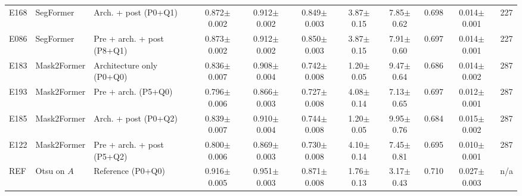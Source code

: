 \begin{table}[t]
\begin{tabularx}{\textwidth}{L{0.7cm} L{1.6cm} Y c c c c c c c c}
E168 & SegFormer & Arch. + post (P0+Q1) & 0.872{\scriptsize$\pm$0.002} & 0.912{\scriptsize$\pm$0.002} & 0.849{\scriptsize$\pm$0.003} & 3.87{\scriptsize$\pm$0.15} & 7.85{\scriptsize$\pm$0.62} & 0.698 & 0.014{\scriptsize$\pm$0.001} & 227 \\
E086 & SegFormer & Pre + arch. + post (P8+Q1) & 0.873{\scriptsize$\pm$0.002} & 0.912{\scriptsize$\pm$0.002} & 0.850{\scriptsize$\pm$0.003} & 3.87{\scriptsize$\pm$0.15} & 7.91{\scriptsize$\pm$0.60} & 0.697 & 0.014{\scriptsize$\pm$0.001} & 227 \\
\addlinespace
E183 & Mask2Former & Architecture only (P0+Q0) & 0.836{\scriptsize$\pm$0.007} & 0.908{\scriptsize$\pm$0.004} & 0.742{\scriptsize$\pm$0.008} & 1.20{\scriptsize$\pm$0.05} & 9.47{\scriptsize$\pm$0.64} & 0.686 & 0.014{\scriptsize$\pm$0.002} & 287 \\
E193 & Mask2Former & Pre + arch. (P5+Q0) & 0.796{\scriptsize$\pm$0.006} & 0.866{\scriptsize$\pm$0.003} & 0.727{\scriptsize$\pm$0.008} & 4.08{\scriptsize$\pm$0.14} & 7.13{\scriptsize$\pm$0.65} & 0.697 & 0.012{\scriptsize$\pm$0.001} & 287 \\
E185 & Mask2Former & Arch. + post (P0+Q2) & 0.839{\scriptsize$\pm$0.007} & 0.910{\scriptsize$\pm$0.004} & 0.744{\scriptsize$\pm$0.008} & 1.20{\scriptsize$\pm$0.05} & 9.95{\scriptsize$\pm$0.76} & 0.684 & 0.015{\scriptsize$\pm$0.002} & 287 \\
E122 & Mask2Former & Pre + arch. + post (P5+Q2) & 0.800{\scriptsize$\pm$0.006} & 0.869{\scriptsize$\pm$0.003} & 0.730{\scriptsize$\pm$0.008} & 4.10{\scriptsize$\pm$0.14} & 7.45{\scriptsize$\pm$0.81} & 0.695 & 0.010{\scriptsize$\pm$0.001} & 287 \\
\addlinespace
REF & Otsu on $A$ & Reference (P0+Q0) & 0.916{\scriptsize$\pm$0.005} & 0.951{\scriptsize$\pm$0.003} & 0.871{\scriptsize$\pm$0.008} & 1.76{\scriptsize$\pm$0.13} & 3.17{\scriptsize$\pm$0.43} & 0.710 & 0.027{\scriptsize$\pm$0.003} & n/a \\
\bottomrule
\end{tabularx}
\end{table}
